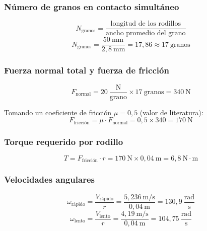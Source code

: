 \subsubsection{Número de granos en contacto simultáneo}
\begin{equation}
N_{\text{granos}} = \frac{\text{longitud de los rodillos}}{\text{ancho promedio del grano}}
\label{eq:Ngranos}
\end{equation}
\begin{equation}
N_{\text{granos}} = \frac{50\ \text{mm}}{2{,}8\ \text{mm}} = 17{,}86 \approx 17\ \text{granos}
\end{equation}

\subsubsection{Fuerza normal total y fuerza de fricción}
\begin{equation}
F_{\text{normal}} = 20\ \frac{\text{N}}{\text{grano}} \times 17\ \text{granos} = 340\ \text{N}
\label{eq:Fnormal}
\end{equation}

Tomando un coeficiente de fricción $\mu = 0{,}5$ (valor de literatura):
\begin{equation}
F_{\text{fricción}} = \mu \cdot F_{\text{normal}} = 0{,}5 \times 340 = 170\ \text{N}
\label{eq:Ffriccion}
\end{equation}

\subsubsection{Torque requerido por rodillo}
\begin{equation}
T = F_{\text{fricción}} \cdot r = 170\ \text{N} \times 0{,}04\ \text{m} = 6{,}8\ \text{N}\!\cdot\!\text{m}
\label{eq:torque}
\end{equation}

\subsubsection{Velocidades angulares}
\begin{equation}
\omega_{\text{rápido}} = \frac{V_{\text{rápido}}}{r} = \frac{5{,}236\ \text{m/s}}{0{,}04\ \text{m}} = 130{,}9\ \frac{\text{rad}}{\text{s}}
\end{equation}
\begin{equation}
\omega_{\text{lento}} = \frac{V_{\text{lento}}}{r} = \frac{4{,}19\ \text{m/s}}{0{,}04\ \text{m}} = 104{,}75\ \frac{\text{rad}}{\text{s}}
\end{equation}

